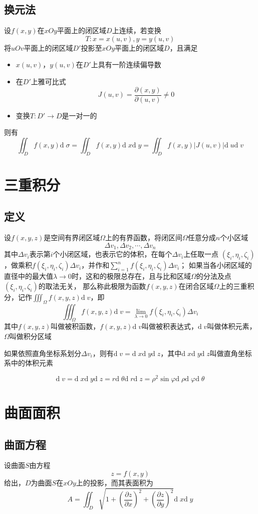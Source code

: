 \documentclass[UTF8]{ctexart}
\newcommand{\dif}[1]{{\text{d}\;\!#1}}
\newcommand{\abs}[1]{{\left|{#1}\right|}}
\begin{document}
\subsection*{换元法}
设$f(x,y)$在$xOy$平面上的闭区域$D$上连续，若变换
\[T:x=x(u,v),y=y(u,v)\]
将$uOv$平面上的闭区域$D'$投影至$xOy$平面上的闭区域$D$，且满足
\begin{itemize}
  \item $x(u,v)$，$y(u,v)$在$D'$上具有一阶连续偏导数
  \item 在$D'$上雅可比式
  \[J(u,v)=\frac{\partial(x,y)}{\partial(u,v)}\ne0\]
  \item 变换$T:D'\to D$是一对一的
\end{itemize}
则有
\[\iint_Df(x,y)\dif{\sigma}=\iint_Df(x,y)\dif{x}\dif{y}=\iint_Df(x,y)\abs{J(u,v)}\dif{u}\dif{v}\]
\bigskip
\bigskip

\section*{三重积分}
\subsection*{定义}
设$f(x,y,z)$是空间有界闭区域$\Omega$上的有界函数，将闭区间$\Omega$任意分成$n$个小区域
\[\Delta v_1,\Delta v_2,\cdots,\Delta v_n\]
其中$\Delta v_i$表示第$i$个小闭区域，也表示它的体积，在每个$\Delta v_i$上任取一点
$(\xi_i,\eta_i,\zeta_i)$，做乘积$f(\xi_i,\eta_i,\zeta_i)\Delta v_i$，并作和$\sum^n_{i=1}f(\xi_i,\eta_i,\zeta_i)\Delta v_i$；
如果当各小闭区域的直径中的最大值$\lambda\to0$时，这和的极限总存在，且与比和区域$\Omega$的分法及点$(\xi_i,\eta_i,\zeta_i)$的取法无关，
那么称此极限为函数$f(x,y,z)$在闭合区域$\Omega$上的三重积分，记作$\displaystyle\iiint_\Omega f(x,y,z)\dif{v}$，即
\[\iiint_\Omega f(x,y,z)\dif{v}=\lim_{\lambda\to0}f(\xi_i,\eta_i,\zeta_i)\Delta v_i\]
其中$f(x,y,z)$叫做被积函数，$f(x,y,z)\dif{v}$叫做被积表达式，$\dif{v}$叫做体积元素，$\Omega$叫做积分区域

如果依照直角坐标系划分$\Delta v_i$，则有$\dif{v}=\dif{x}\dif{y}\dif{z}$，其中$\dif{x}\dif{y}\dif{z}$叫做直角坐标系中的体积元素

\[\dif{v}=\dif{x}\dif{y}\dif{z}=r\dif{\theta}\dif{r}\dif{z}=\rho^2\sin\varphi\dif{\rho}\dif{\varphi}\dif{\theta}\]
\bigskip
\bigskip

\section*{曲面面积}
\subsection*{曲面方程}
设曲面$S$由方程
\[z=f(x,y)\]
给出，$D$为曲面$S$在$xOy$上的投影，而其表面积为
\[A=\iint_D\sqrt{1+{\left(\frac{\partial z}{\partial x}\right)}^2+{\left(\frac{\partial z}{\partial y}\right)}^2}\dif{x}\dif{y}\]
\end{document}
